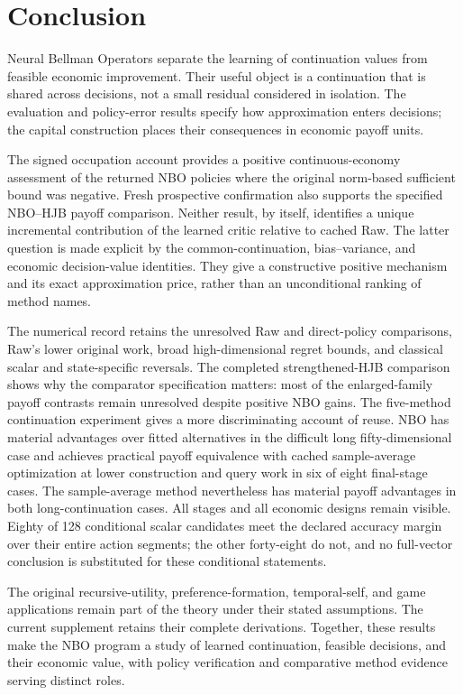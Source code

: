 \section{Conclusion}\label{sec:conclusion}
Neural Bellman Operators separate the learning of continuation values from feasible economic improvement. Their useful object is a continuation that is shared across decisions, not a small residual considered in isolation. The evaluation and policy-error results specify how approximation enters decisions; the capital construction places their consequences in economic payoff units.

The signed occupation account provides a positive continuous-economy assessment of the returned NBO policies where the original norm-based sufficient bound was negative. Fresh prospective confirmation also supports the specified NBO--HJB payoff comparison. Neither result, by itself, identifies a unique incremental contribution of the learned critic relative to cached Raw. The latter question is made explicit by the common-continuation, bias--variance, and economic decision-value identities. They give a constructive positive mechanism and its exact approximation price, rather than an unconditional ranking of method names.

The numerical record retains the unresolved Raw and direct-policy comparisons, Raw's lower original work, broad high-dimensional regret bounds, and classical scalar and state-specific reversals. The completed strengthened-HJB comparison shows why the comparator specification matters: most of the enlarged-family payoff contrasts remain unresolved despite positive NBO gains. The five-method continuation experiment gives a more discriminating account of reuse. NBO has material advantages over fitted alternatives in the difficult long fifty-dimensional case and achieves practical payoff equivalence with cached sample-average optimization at lower construction and query work in six of eight final-stage cases. The sample-average method nevertheless has material payoff advantages in both long-continuation cases. All stages and all economic designs remain visible. Eighty of 128 conditional scalar candidates meet the declared accuracy margin over their entire action segments; the other forty-eight do not, and no full-vector conclusion is substituted for these conditional statements.

The original recursive-utility, preference-formation, temporal-self, and game applications remain part of the theory under their stated assumptions. The current supplement retains their complete derivations. Together, these results make the NBO program a study of learned continuation, feasible decisions, and their economic value, with policy verification and comparative method evidence serving distinct roles.
